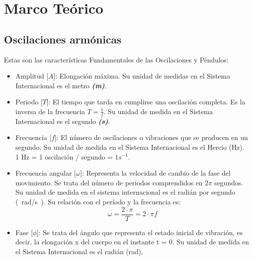 \documentclass[twocolumn, 12pt]{article}
\newcommand{\bolditalic}[1]{\textbf{\textit{#1}}}
\begin{document}
\section{Marco Teórico}

\subsection{Oscilaciones armónicas}

Estas son las características Fundamentales de las
Oscilaciones y Péndulos:

\begin{itemize}[label=$\triangleright$]
    \item Amplitud [{\large $A$}]: Elongación máxima. Su unidad de
          medidas en el Sistema Internacional es el metro
          \bolditalic{(m)}.

    \item Periodo [{\large $T$}]: El tiempo que tarda en cumplirse
          una oscilación completa. Es la inversa de la frecuencia $T
              = \frac{1}{f}$. Su unidad de medida en el Sistema
          Internacional es el segundo \bolditalic{(s)}.

    \item Frecuencia [{\large $f$}]: El número de oscilaciones o
          vibraciones que se producen en un segundo. Su unidad de
          medida en el Sistema Internacional es el Hercio (Hz). 1 Hz
          = 1 oscilación / segundo = $1 s^{-1}$.

    \item Frecuencia angular [{\large $\omega$}]: Representa la
          velocidad de cambio de la fase del movimiento. Se trata del
          número de periodos comprendidos en $2\pi$ segundos. Su
          unidad de medida en el sistema internacional es el radián
          por segundo (\@~rad/s\@~). Su relación con el período y la
          frecuencia es: {\large
          \begin{equation}
              \omega = \frac{2 \cdot \pi}{T} = 2 \cdot \pi f
          \end{equation}
          }

    \item Fase [{\large $\phi$}]: Se trata del ángulo que representa
          el estado inicial de vibración, es decir, la elongación x
          del cuerpo en el instante t = 0. Su unidad de medida en el
          Sistema Internacional es el radián (rad).
\end{itemize}
\end{document}
